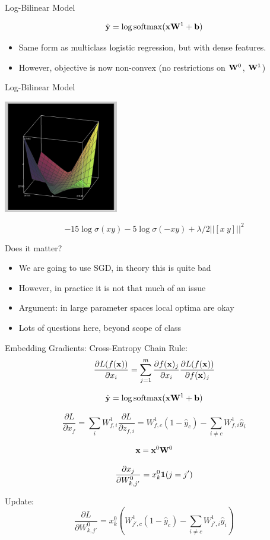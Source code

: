 \documentclass{beamer}
\begin{document}
\begin{frame}{Log-Bilinear Model}


  \[ \hat{\boldy} = \log \softmax (\boldx \boldW^1 + \boldb) \]

  \begin{itemize}
  \item Same form as multiclass logistic regression, but with dense features.
  \item However, objective is now non-convex (no restrictions on $\mathbf{W}^0$, $\mathbf{W}^1$)
  \end{itemize}
\end{frame}

\begin{frame}{Log-Bilinear Model}
  \begin{center}
    \includegraphics[width=5cm]{logbilinear}
  \end{center}
  \[-15\log \sigma(xy)-5\log\sigma(-xy) + \lambda/2 ||[x\ y]||^2 \]

\end{frame}


\begin{frame}{Does it matter?}
  \begin{itemize}
  \item We are going to use SGD, in theory this is quite bad
    \air
  \item However, in practice it is not that much of an issue
    \air
  \item Argument: in large parameter spaces local optima are okay
    \air
  \item Lots of questions here, beyond scope of class
  \end{itemize}
\end{frame}

\begin{frame}{Embedding Gradients: Cross-Entropy}
  Chain Rule:
  \[ \frac{\partial L(f(\mathbf{x}))}{\partial x_i} = \sum_{j =1}^m \frac{\partial f(\mathbf{x})_j} {\partial  x_i} \frac{\partial L(f(\mathbf{x}))} {\partial f(\mathbf{x})_j}   \]

  \[ \hat{\boldy} = \log \softmax (\boldx \boldW^1 + \boldb) \]

  \[\frac{\partial L}{\partial x_{f}} =
    \sum_{i} W^1_{f, i} \frac{\partial L}{\partial z_{f, i}} =
     W^1_{f,c}  (1-\hat{y}_c)  - \sum_{i \neq c} W^1_{f,i}  \hat{y}_i
  \]

  \[ \mathbf{x} = \mathbf{x}^0 \mathbf{W}^0 \]

  \[\frac{\partial x_j}{\partial W^0_{k, j'}} = x^0_{k}  \mathbf{1}(j = j')  \]

  Update:
  \[\frac{\partial L}{\partial W^0_{k,j'}} = x^0_{k}      (W^1_{j',c} (1-\hat{y}_c)  - \sum_{i \neq c} W^1_{j',i}  \hat{y}_i)  \]
\end{frame}
\end{document}
